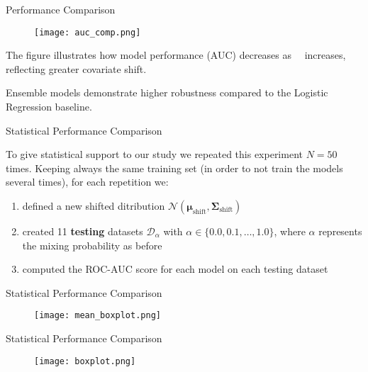 \begin{frame}{Performance Comparison}

    \begin{figure}
        \centering
        \vfill
        \texttt{[image: auc\_comp.png]}
    \end{figure}

    \small

    The figure illustrates how model performance (AUC) decreases as \ \alpha \ increases, reflecting greater covariate shift.

    Ensemble models demonstrate higher robustness compared to the Logistic Regression baseline.

\end{frame}

\begin{frame}{Statistical Performance Comparison}

    To give statistical support to our study we repeated this experiment $N = 50$ times. Keeping always the same training set (in order to not train the models several times), for each repetition we:
    \begin{enumerate}
        \item defined a new shifted ditribution $\mathcal{N}(\boldsymbol{\mu}_{\text{shift}}, \boldsymbol{\Sigma}_{\text{shift}}) $
        \item created 11 \textbf{testing} datasets $\mathcal{D}_\alpha$ with $\alpha \in \{0.0, 0.1, \ldots, 1.0\}$, where $\alpha$ represents the mixing probability as before
        \item computed the ROC-AUC score for each model on each testing dataset
    \end{enumerate}
\end{frame}

\begin{frame}{Statistical Performance Comparison}

  \begin{figure}
      \centering
      \vfill
      \texttt{[image: mean\_boxplot.png]}
  \end{figure}

\end{frame}

\begin{frame}{Statistical Performance Comparison}

    \begin{figure}
        \centering
        \vfill
        \texttt{[image: boxplot.png]}
    \end{figure}

\end{frame}
